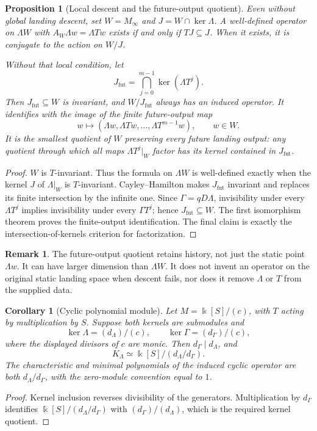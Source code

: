 \documentclass[11pt]{amsart}
\newtheorem{proposition}[theorem]{Proposition}
\newtheorem{corollary}[theorem]{Corollary}
\theoremstyle{definition}
\newtheorem{remark}[theorem]{Remark}
\newcommand{\kk}{\Bbbk}
\begin{document}
\begin{proposition}[Local descent and the future-output quotient]\label{prop:local-descent}
Even without global landing descent, set \(W=M_\infty\) and
\(J=W\cap\ker\Lambda\). A well-defined operator on \(\Lambda W\) with
\(A_W\Lambda w=\Lambda Tw\) exists if and only if \(TJ\subseteq J\).
When it exists, it is conjugate to the action on \(W/J\).

Without that local condition, let
\[
J_{\mathrm{fut}}=\bigcap_{j=0}^{m-1}\ker(\Lambda T^j).
\]
Then \(J_{\mathrm{fut}}\subseteq W\) is invariant, and \(W/J_{\mathrm{fut}}\)
always has an induced operator. It identifies with the image of the finite
future-output map
\[
w\longmapsto(\Lambda w,\Lambda Tw,\ldots,\Lambda T^{m-1}w),\qquad w\in W.
\]
It is the smallest quotient of \(W\) preserving every future landing output:
any quotient through which all maps \(\Lambda T^j|_W\) factor has its kernel
contained in \(J_{\mathrm{fut}}\).
\end{proposition}
\begin{proof}
\(W\) is \(T\)-invariant. Thus the formula on \(\Lambda W\) is well-defined
exactly when the kernel \(J\) of \(\Lambda|_W\) is \(T\)-invariant.
Cayley--Hamilton makes \(J_{\mathrm{fut}}\) invariant and replaces its finite
intersection by the infinite one. Since \(\Gamma=qD\Lambda\), invisibility
under every \(\Lambda T^j\) implies invisibility under every \(\Gamma T^j\);
hence \(J_{\mathrm{fut}}\subseteq W\).
The first isomorphism theorem proves the finite-output identification.
The final claim is exactly the intersection-of-kernels criterion for factorization.
\end{proof}

\begin{remark}
The future-output quotient retains history, not just the static point \(\Lambda w\).
It can have larger dimension than \(\Lambda W\). It does not invent an operator
on the original static landing space when descent fails, nor does it remove
\(\Lambda\) or \(T\) from the supplied data.
\end{remark}

\begin{corollary}[Cyclic polynomial module]\label{cor:cyclic}
Let \(M=\kk[S]/(c)\), with \(T\) acting by multiplication by \(S\).
Suppose both kernels are submodules and
\[
\ker\Lambda=(d_\Lambda)/(c),\qquad
\ker\Gamma=(d_\Gamma)/(c),
\]
where the displayed divisors of \(c\) are monic. Then \(d_\Gamma\mid d_\Lambda\), and
\[
K_\Lambda\simeq \kk[S]/(d_\Lambda/d_\Gamma).
\]
The characteristic and minimal polynomials of the induced cyclic operator are both
\(d_\Lambda/d_\Gamma\), with the zero-module convention equal to \(1\).
\end{corollary}
\begin{proof}
Kernel inclusion reverses divisibility of the generators. Multiplication by
\(d_\Gamma\) identifies
\(\kk[S]/(d_\Lambda/d_\Gamma)\) with
\((d_\Gamma)/(d_\Lambda)\), which is the required kernel quotient.
\end{proof}
\end{document}
